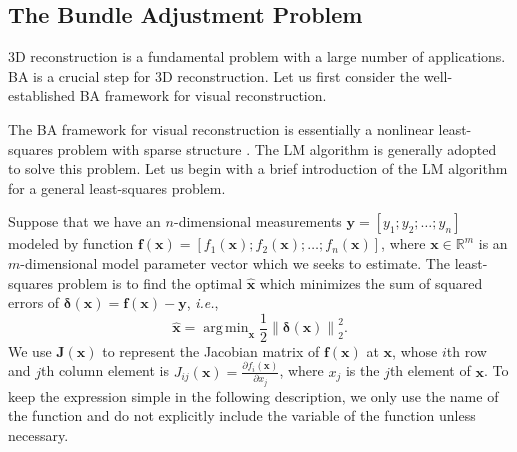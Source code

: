 \documentclass{vgtc}                          %
\DeclareMathOperator*{\argmin}{arg\,min}
\begin{document}
\subsection{The Bundle Adjustment Problem}
3D reconstruction is a fundamental problem  with a large number of applications. BA is a crucial step for 3D reconstruction.  Let us first consider the  well-established BA framework for visual reconstruction. 

The  BA framework for  visual reconstruction is essentially a  nonlinear least-squares problem with sparse structure \cite{triggs1999bundle,wu2011multicore,agarwal2010bundle,lourakis2009sba,liu2018ice}. The  LM algorithm \cite{levenberg1944method,more1978levenberg} is generally adopted to solve this problem.  Let us begin with  a brief introduction of the LM algorithm for a general least-squares problem. 

Suppose that we have an  $n$-dimensional measurements $\mathbf{y}=\left[ y_1;y_2; \dots; y_n\right] $  modeled by function $ \mathbf{f}\left( \mathbf{x}\right) = \left[ f_1\left(\mathbf{x} \right); f_2\left(\mathbf{x}\right); \dots; f_n\left(\mathbf{x} \right) \right] $, where $\mathbf{x} \in \mathbb{R}^{m}$ is an $m$-dimensional model parameter vector which we seeks to estimate. The least-squares problem is to find the optimal $\hat{\mathbf{x}}$ which minimizes the sum of squared errors of $ \bm{\delta}\left( \mathbf{x}\right) =  \mathbf{f}\left( \mathbf{x}\right) - \mathbf{y}$, \textit{i.e.}, 
\begin{equation} \label{equ_lm}
\hat{\mathbf{x}} = \argmin_{\mathbf{x}}\frac{1}{2}\left\| \bm{\delta}\left( \mathbf{x}\right) \right\|_2^2.
\end{equation}
We use $\mathbf{J}\left( \mathbf{x}\right)$ to  represent  the Jacobian matrix of $\mathbf{f}\left( \mathbf{x}\right) $ at $\mathbf{x}$, %
whose $i$th row  and $j$th column element is $J_{ij}\left(\mathbf{x}\right) = \frac{\partial{f_i\left(\mathbf{x} \right) }}{\partial{x_j}}$, where $x_j$ is the $j$th element of $\mathbf{x}$.  To keep the expression simple in the following description, we only use the name of the function and do not explicitly include the variable of the function unless necessary.  
\end{document}
